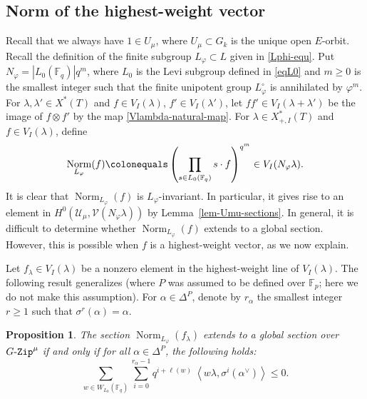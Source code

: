 \documentclass[10pt,a4paper]{article}
\numberwithin{equation}{section}
\newtheorem{proposition}[theorem]{Proposition}
\theoremstyle{definition}
\theoremstyle{remark}
\newcommand{\GZip}{\mathop{\text{$G$-{\tt Zip}}}\nolimits}
\newcommand{\Ucal}{{\mathcal U}}
\newcommand{\Vcal}{{\mathcal V}}
\newcommand{\FF}{\mathbb{F}}
\DeclareMathOperator{\Norm}{Norm}
\begin{document}
\setcounter{section}{3}\setcounter{subsection}{4}\setcounter{theorem}{8}\setcounter{equation}{6}

\subsection{Norm of the highest-weight vector}\label{subsec-norm}

Recall that we always have $1\in U_\mu$, where $U_{\mu}\subset G_k$ is the unique open $E$-orbit. Recall the definition of the finite subgroup $L_\varphi\subset L$ given in \eqref{Lphi-equ}. Put $N_\varphi=|L_0(\FF_q)|q^m$, where $L_0$ is the Levi subgroup defined in \eqref{eqL0} and $m\geq 0$ is the smallest integer such that the finite unipotent group $L_\varphi^{\circ}$ is annihilated by $\varphi^m$. For $\lambda,\lambda'\in X^*(T)$ and $f\in V_I(\lambda)$, $f'\in V_I(\lambda')$, let $ff'\in V_I(\lambda+\lambda')$ be the image of $f\otimes f'$ by the map \eqref{Vlambda-natural-map}. For $\lambda\in X^*_{+,I}(T)$ and $f\in V_I(\lambda)$, define
\begin{equation} \label{norm-def-eq}
\Norm_{L_\varphi}(f)\colonequals \left(\prod_{s\in L_0(\FF_q)}s\cdot f \right)^{q^m}\in V_I(N_\varphi \lambda).
\end{equation}
It is clear that $\Norm_{L_\varphi}(f)$ is $L_\varphi$-invariant. In particular, it gives rise to an element in $H^0(\Ucal_\mu,\Vcal(N_\varphi \lambda))$ by Lemma~\ref{lem-Umu-sections}. In general, it is difficult to determine whether $\Norm_{L_\varphi}(f)$ extends to a global section. However, this is possible when $f$ is a highest-weight vector, as we now explain.

Let $f_\lambda\in V_I(\lambda)$ be a nonzero element in the highest-weight line of $V_I(\lambda)$. The following result generalizes \cite[Theorem 2]{Koskivirta-automforms-GZip} (where $P$ was assumed to be defined over $\FF_p$; here we do not make this assumption). For $\alpha\in \Delta^P$, denote by $r_\alpha$ the smallest integer $r\geq 1$ such that $\sigma^r(\alpha)=\alpha$.


\begin{proposition}\label{prop-Norm}
The section $\Norm_{L_\varphi}(f_\lambda)$ extends to a global section over $\GZip^\mu$ if and only if for all $\alpha \in \Delta^P$, the following holds:
\begin{equation}\label{formula-norm}
\sum_{w\in W_{L_0}(\FF_q)} \sum_{i=0}^{r_\alpha-1} q^{i+\ell(w)} \ \left\langle w\lambda, \sigma^i\left(\alpha^\vee\right) \right\rangle\leq 0.
\end{equation}
\end{proposition}
\end{document}
